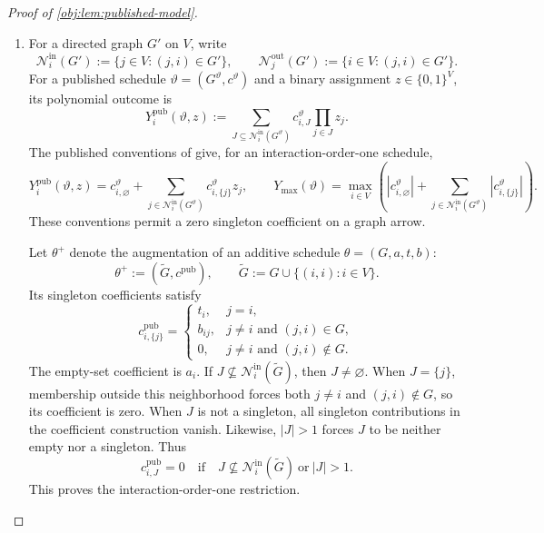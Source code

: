 \documentclass[11pt]{article}
\begin{document}
\begin{proof}[Proof of \cref{obj:lem:published-model}]
\begin{enumerate}
\item For a directed graph \(G'\) on \(V\), write
\[
\mathcal N^{\mathrm{in}}_i(G')
:=\{j\in V:(j,i)\in G'\},
\qquad
\mathcal N^{\mathrm{out}}_j(G')
:=\{i\in V:(j,i)\in G'\}.
\]
For a published schedule \(\vartheta=(G^\vartheta,c^\vartheta)\) and a binary assignment \(z\in\{0,1\}^V\), its polynomial outcome is
\[
Y_i^{\mathrm{pub}}(\vartheta,z)
:=
\sum_{J\subseteq\mathcal N^{\mathrm{in}}_i(G^\vartheta)}
c^\vartheta_{i,J}\prod_{j\in J}z_j.
\]
The published conventions of
\citep[Sections 3.1--3.2, Assumptions 1--2, equations (3.2)--(3.3)]{CortezRodriguezEichhornYu2023SNIPE}
give, for an interaction-order-one schedule,
\[
Y_i^{\mathrm{pub}}(\vartheta,z)
=
c^\vartheta_{i,\varnothing}
+\sum_{j\in\mathcal N^{\mathrm{in}}_i(G^\vartheta)}
c^\vartheta_{i,\{j\}}z_j,
\qquad
Y_{\max}(\vartheta)
=
\max_{i\in V}
\left(
|c^\vartheta_{i,\varnothing}|
+\sum_{j\in\mathcal N^{\mathrm{in}}_i(G^\vartheta)}
|c^\vartheta_{i,\{j\}}|
\right).
\]
These conventions permit a zero singleton coefficient on a graph arrow.

Let \(\theta^+\) denote the augmentation of an additive schedule \(\theta=(G,a,t,b)\):
\[
\theta^+:=(\widetilde G,c^{\mathrm{pub}}),
\qquad
\widetilde G:=G\cup\{(i,i):i\in V\}.
\]
Its singleton coefficients satisfy
\[
c^{\mathrm{pub}}_{i,\{j\}}
=
\begin{cases}
t_i,&j=i,\\
b_{ij},&j\ne i\text{ and }(j,i)\in G,\\
0,&j\ne i\text{ and }(j,i)\notin G.
\end{cases}
\]
The empty-set coefficient is \(a_i\). If
\(J\not\subseteq\mathcal N^{\mathrm{in}}_i(\widetilde G)\), then \(J\ne\varnothing\).
When \(J=\{j\}\), membership outside this neighborhood forces both
\(j\ne i\) and \((j,i)\notin G\), so its coefficient is zero.
When \(J\) is not a singleton, all singleton contributions in the coefficient construction vanish. Likewise, \(|J|>1\) forces \(J\) to be neither empty nor a singleton. Thus
\[
c^{\mathrm{pub}}_{i,J}=0
\quad\text{if}\quad
J\not\subseteq\mathcal N^{\mathrm{in}}_i(\widetilde G)
\ \text{or}\ |J|>1.
\]
This proves the interaction-order-one restriction.


\end{enumerate}
\end{proof}
\end{document}
